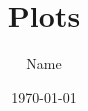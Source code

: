 \documentclass[12pt]{article}
\begin{document}
\title{Plots}
\author{Name}
\date{\today} %
\maketitle

\end{document}

